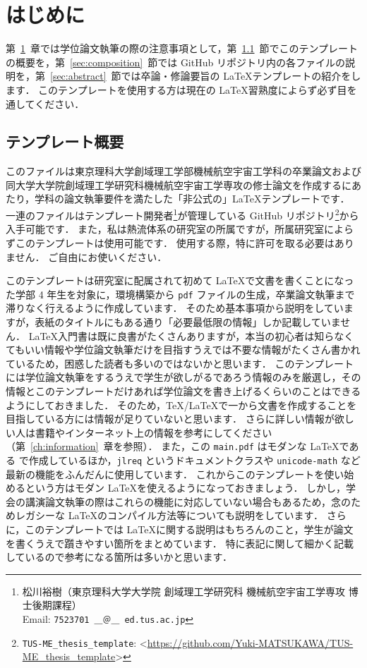 \chapter{はじめに}
\label{ch:introduction}

第~\ref{ch:introduction}~章では学位論文執筆の際の注意事項として，第~\ref{sec:template}~節でこのテンプレートの概要を，第~\ref{sec:composition}~節では GitHub リポジトリ内の各ファイルの説明を，第~\ref{sec:abstract}~節では卒論・修論要旨の \LaTeX テンプレートの紹介をします．
このテンプレートを使用する方は現在の \LaTeX 習熟度によらず必ず目を通してください．

\section{テンプレート概要}
\label{sec:template}

このファイルは東京理科大学創域理工学部機械航空宇宙工学科の卒業論文および同大学大学院創域理工学研究科機械航空宇宙工学専攻の修士論文を作成するにあたり，学科の論文執筆要件を満たした「非公式の」\LaTeX テンプレートです．
一連のファイルはテンプレート開発者\footnote{松川裕樹（東京理科大学大学院 創域理工学研究科 機械航空宇宙工学専攻 博士後期課程）\\ \quad Email: \texttt{7523701 ＿＠＿ ed.tus.ac.jp}}が管理している GitHub リポジトリ\footnote{\texttt{TUS-ME\_thesis\_template}: \textless\url{https://github.com/Yuki-MATSUKAWA/TUS-ME_thesis_template}\textgreater}から入手可能です．
また，私は熱流体系の研究室の所属ですが，所属研究室によらずこのテンプレートは使用可能です．
使用する際，特に許可を取る必要はありません．
ご自由にお使いください．

このテンプレートは研究室に配属されて初めて \LaTeX で文書を書くことになった学部 4 年生を対象に，環境構築から \verb|pdf| ファイルの生成，卒業論文執筆まで滞りなく行えるように作成しています．
そのため基本事項から説明をしていますが，表紙のタイトルにもある通り「必要最低限の情報」しか記載していません．
\LaTeX 入門書は既に良書がたくさんありますが，本当の初心者は知らなくてもいい情報や学位論文執筆だけを目指すうえでは不要な情報がたくさん書かれているため，困惑した読者も多いのではないかと思います．
このテンプレートには学位論文執筆をするうえで学生が欲しがるであろう情報のみを厳選し，その情報とこのテンプレートだけあれば学位論文を書き上げるくらいのことはできるようにしておきました．
そのため，\TeX/\LaTeX で一から文書を作成することを目指している方には情報が足りていないと思います．
さらに詳しい情報が欲しい人は書籍やインターネット上の情報を参考にしてください（第~\ref{ch:information}~章を参照）．
また，この \verb|main.pdf| はモダンな \LaTeX である \LuaLaTeX で作成しているほか，\verb|jlreq| というドキュメントクラスや \verb|unicode-math| など最新の機能をふんだんに使用しています．
これからこのテンプレートを使い始めるという方はモダン \LaTeX を使えるようになっておきましょう．
しかし，学会の講演論文執筆の際はこれらの機能に対応していない場合もあるため，念のためレガシーな \LaTeX のコンパイル方法等についても説明をしています．
さらに，このテンプレートでは \LaTeX に関する説明はもちろんのこと，学生が論文を書くうえで躓きやすい箇所をまとめています．
特に表記に関して細かく記載しているので参考になる箇所は多いかと思います．


